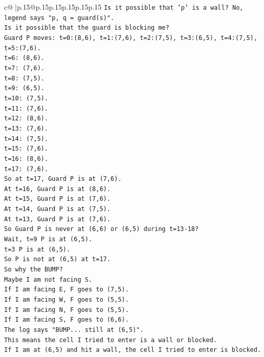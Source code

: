 \documentclass{article}
\begin{document}
{\begin{supertabular}{c@{$\;$}|p{.15\linewidth}@{}p{.15\linewidth}p{.15\linewidth}p{.15\linewidth}p{.15\linewidth}p{.15\linewidth}}
{{{\texttt{Is it possible that 'p' is a wall? No, legend says "p, q = guard(s)".} \\
\texttt{Is it possible that the guard is blocking me?} \\
\texttt{Guard P moves: t=0:(8,6), t=1:(7,6), t=2:(7,5), t=3:(6,5), t=4:(7,5), t=5:(7,6).} \\
\texttt{t=6: (8,6).} \\
\texttt{t=7: (7,6).} \\
\texttt{t=8: (7,5).} \\
\texttt{t=9: (6,5).} \\
\texttt{t=10: (7,5).} \\
\texttt{t=11: (7,6).} \\
\texttt{t=12: (8,6).} \\
\texttt{t=13: (7,6).} \\
\texttt{t=14: (7,5).} \\
\texttt{t=15: (7,6).} \\
\texttt{t=16: (8,6).} \\
\texttt{t=17: (7,6).} \\
\texttt{So at t=17, Guard P is at (7,6).} \\
\texttt{At t=16, Guard P is at (8,6).} \\
\texttt{At t=15, Guard P is at (7,6).} \\
\texttt{At t=14, Guard P is at (7,5).} \\
\texttt{At t=13, Guard P is at (7,6).} \\
\texttt{So Guard P is never at (6,6) or (6,5) during t=13{-}18?} \\
\texttt{Wait, t=9 P is at (6,5).} \\
\texttt{t=3 P is at (6,5).} \\
\texttt{So P is not at (6,5) at t=17.} \\
\texttt{So why the BUMP?} \\
\texttt{Maybe I am not facing S.} \\
\texttt{If I am facing E, F goes to (7,5).} \\
\texttt{If I am facing W, F goes to (5,5).} \\
\texttt{If I am facing N, F goes to (5,5).} \\
\texttt{If I am facing S, F goes to (6,6).} \\
\texttt{The log says "BUMP... still at (6,5)".} \\
\texttt{This means the cell I tried to enter is a wall or blocked.} \\
\texttt{If I am at (6,5) and hit a wall, the cell I tried to enter is blocked.} \\
}}}
\end{supertabular}}
\end{document}
